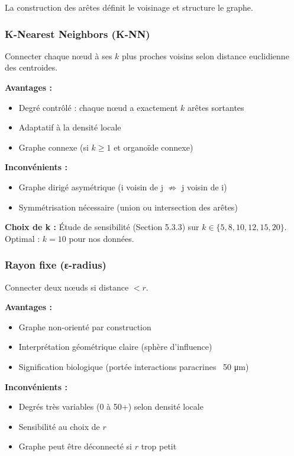 La construction des arêtes définit le voisinage et structure le graphe.

\subsubsection{K-Nearest Neighbors (K-NN)}

Connecter chaque nœud à ses $k$ plus proches voisins selon distance euclidienne des centroides.

\textbf{Avantages :}
\begin{itemize}
    \item Degré contrôlé : chaque nœud a exactement $k$ arêtes sortantes
    \item Adaptatif à la densité locale
    \item Graphe connexe (si $k \geq 1$ et organoïde connexe)
\end{itemize}

\textbf{Inconvénients :}
\begin{itemize}
    \item Graphe dirigé asymétrique (i voisin de j $\not\Rightarrow$ j voisin de i)
    \item Symmétrisation nécessaire (union ou intersection des arêtes)
\end{itemize}

\textbf{Choix de k :}
Étude de sensibilité (Section 5.3.3) sur $k \in \{5, 8, 10, 12, 15, 20\}$. Optimal : $k = 10$ pour nos données.

\subsubsection{Rayon fixe (ε-radius)}

Connecter deux nœuds si distance $< r$.

\textbf{Avantages :}
\begin{itemize}
    \item Graphe non-orienté par construction
    \item Interprétation géométrique claire (sphère d'influence)
    \item Signification biologique (portée interactions paracrines ~50 μm)
\end{itemize}

\textbf{Inconvénients :}
\begin{itemize}
    \item Degrés très variables (0 à 50+) selon densité locale
    \item Sensibilité au choix de $r$
    \item Graphe peut être déconnecté si $r$ trop petit
\end{itemize}

